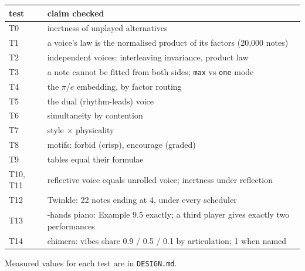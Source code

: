 \documentclass[11pt,a4paper]{article}
\newcommand{\ttx}[1]{\texttt{#1}}
\begin{document}
\begin{center}
\small
\begin{tabularx}{\linewidth}{@{}l>{\raggedright\arraybackslash}X@{}}
\toprule
test & claim checked \\
\midrule
T0 & inertness of unplayed alternatives \\
T1 & a voice's law is the normalised product of its factors (20{,}000 notes) \\
T2 & independent voices: interleaving invariance, product law \\
T3 & a note cannot be fitted from both sides; \ttx{max} vs \ttx{one} mode \\
T4 & the $\pi$/$e$ embedding, by factor routing \\
T5 & the dual (rhythm-leads) voice \\
T6 & simultaneity by contention \\
T7 & style $\times$ physicality \\
T8 & motifs: forbid (crisp), encourage (graded) \\
T9 & tables equal their formulae \\
T10, T11 & reflective voice equals unrolled voice; inertness under reflection \\
T12 & Twinkle: 22 notes ending at 4, under every scheduler \\
T13 & 4-hands piano: Example 9.5 exactly; a third player gives exactly two
  performances \\
T14 & chimera: vibes share 0.9 / 0.5 / 0.1 by articulation; 1 when named \\
\bottomrule
\end{tabularx}
\end{center}

\noindent Measured values for each test are in \ttx{DESIGN.md}.
\end{document}
